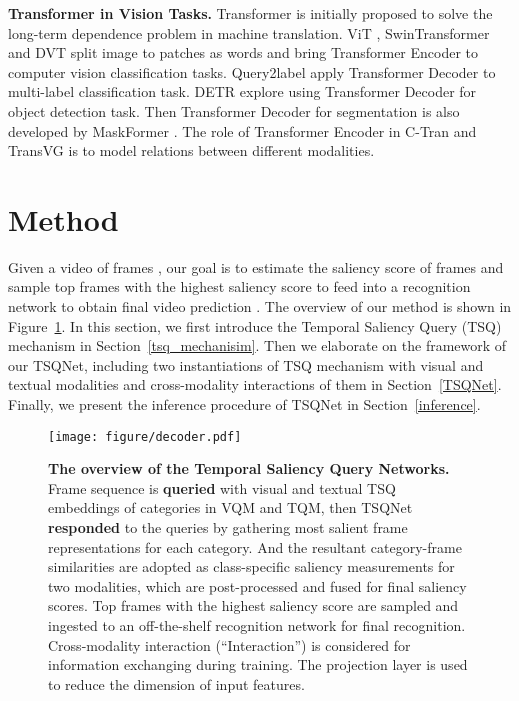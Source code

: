 \documentclass[runningheads]{llncs}
\newcommand{\figref}[1]{Figure~\ref{#1}}
\newcommand{\secref}[1]{Section~\ref{#1}}
\begin{document}
\noindent\textbf{Transformer in Vision Tasks.} Transformer \cite{transformer} is initially proposed to solve the long-term dependence problem in machine translation.
ViT \cite{vit}, SwinTransformer  \cite{swintransformer} and DVT \cite{dvt} split image to patches as words and bring Transformer Encoder to computer vision classification tasks. Query2label \cite{query2label} apply Transformer Decoder to multi-label classification task.
DETR \cite{detr} explore using Transformer Decoder for object detection task.  
Then Transformer Decoder for segmentation is also developed by MaskFormer  \cite{maskformer}. 
The role of Transformer Encoder in C-Tran \cite{ctran} and TransVG \cite{transvg} is to model relations between different modalities.





\section{Method}
Given a video of  frames  , our goal is to estimate the saliency score of frames  and sample top  frames with the highest saliency score to feed into a recognition network to obtain final video prediction . The overview of our method is shown in \figref{Fig.main1}. 
In this section, we first introduce the Temporal Saliency Query (TSQ) mechanism in \secref{tsq_mechanisim}. Then we elaborate on the framework of our TSQNet, including two instantiations of TSQ mechanism with visual and textual modalities and cross-modality interactions of them in \secref{TSQNet}. Finally, we present the inference procedure of TSQNet in \secref{inference}.





\begin{figure}[t] \centering \texttt{[image: figure/decoder.pdf]} \caption{\textbf{The overview of the Temporal Saliency Query Networks.} Frame sequence is \textbf{queried} with visual and textual TSQ embeddings of categories in VQM and TQM, then TSQNet \textbf{responded} to the queries by gathering most salient frame representations for each category. And the resultant category-frame similarities are adopted as class-specific saliency measurements for two modalities, which are post-processed and fused for final saliency scores. Top  frames with the highest saliency score are sampled and ingested to an off-the-shelf recognition network for final recognition. 
Cross-modality interaction (``Interaction'') is considered for information exchanging during training. 
The projection layer is used to reduce the dimension of input features. 
} \label{Fig.main1} \end{figure}
\end{document}
